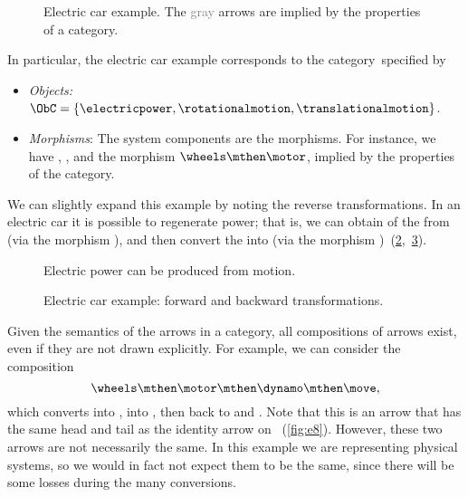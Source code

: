 \begin{figure}[h!]
	\centering
	\caption{
		Electric car example.
		The \textcolor{gray}{gray} arrows are implied by the properties of a category.
	}
	\label{fig:e5}
\end{figure}

In particular, the electric car example corresponds to the category~\CatC specified by
\begin{itemize}
	\item \emph{Objects:} $\ObC=\{ \electricpower,\rotationalmotion,\translationalmotion\}$.
	\item \emph{Morphisms}: The system components are the morphisms.
	      For instance, we have \motor, \wheels, and the morphism $\wheels \mthen \motor$, implied by the properties of the category.
\end{itemize}

We can slightly expand this example by noting the reverse transformations.
In an electric car it is possible to regenerate power; that is, we can obtain \rotationalmotion of the \wheels from
\translationalmotion (via the morphism \move), and then convert the \rotationalmotion into \electricpower (via the morphism \dynamo)~(\cref{fig:e6},~\cref{fig:e6-together}).

\begin{figure}[h!]
	\centering
	\caption{Electric power can be produced from motion.}
	\label{fig:e6}
\end{figure}

\begin{figure}[h!]
	\centering
	\caption{Electric car example: forward and backward transformations.\label{fig:e6-together}}
\end{figure}
Given the semantics of the arrows in a category, all compositions of arrows exist, even if they are not drawn explicitly.
For example, we can consider the composition
\begin{equation*}
	\wheels \mthen \motor \mthen \dynamo \mthen \move,
\end{equation*}
which converts \translationalmotion into \rotationalmotion, into \electricpower, then back to
\rotationalmotion and \translationalmotion.
Note that this is an arrow that has the same head and tail as the identity arrow on \translationalmotion~(\cref{fig:e8}).
However, these two arrows are not necessarily the same.
In this example we are representing physical systems, so we would in fact not expect them to be the same, since there will be some losses during the many conversions.

